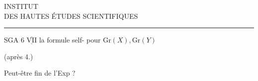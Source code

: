 \begin{center}
INSTITUT\\
DES HAUTES ÉTUDES SCIENTIFIQUES\\[-.4ex]
\rule{1.4cm}{.4pt}
\end{center}

SGA 6 $\overline{\underline{\mathrm{VII}}}$ \qquad {} la formule  self- pour $\mathrm{Gr}(X),\mathrm{Gr}(Y)$

(après 4.)

Peut-être fin de l'Exp ?

